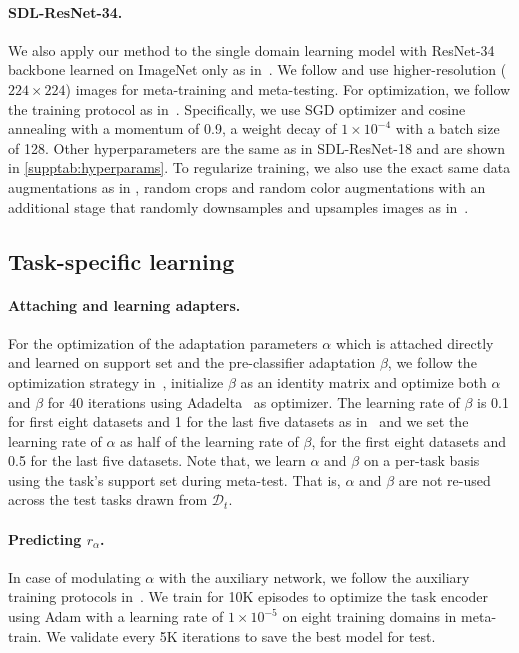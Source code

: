 \paragraph{SDL-ResNet-34.}
We also apply our method to the single domain learning model with ResNet-34 backbone learned on ImageNet only as in~\cite{doersch2020crosstransformers}. We follow \cite{doersch2020crosstransformers} and use higher-resolution ($224\times 224$) images for meta-training and meta-testing. For optimization, we follow the training protocol as in~\cite{dvornik2020selecting,li2021universal}. Specifically, we use SGD optimizer and cosine annealing with a momentum of 0.9, a weight decay of $1\times 10^{-4}$ with a batch size of 128. Other hyperparameters are the same as in SDL-ResNet-18 and are shown in \cref{supptab:hyperparams}.
To regularize training, we also use the exact same data augmentations as in \cite{dvornik2020selecting,li2021universal}, \eg random crops and random color augmentations with an additional stage that randomly downsamples and upsamples images as in~\cite{doersch2020crosstransformers}. 


\subsection{Task-specific learning}

\paragraph{Attaching and learning adapters.}
For the optimization of the adaptation parameters $\alpha$ which is attached directly and learned on support set and the pre-classifier adaptation $\beta$, we follow the optimization strategy in~\cite{li2021universal}, initialize $\beta$ as an identity matrix and optimize both $\alpha$ and $\beta$ for 40 iterations using Adadelta~\cite{zeiler2012adadelta} as optimizer. The learning rate of $\beta$ is 0.1 for first eight datasets and 1 for the last five datasets as in~\cite{li2021universal} and we set the learning rate of $\alpha$ as half of the learning rate of $\beta$,  for the first eight datasets and 0.5 for the last five datasets. Note that, we learn $\alpha$ and $\beta$ on a per-task basis using the task's support set during meta-test. That is, $\alpha$ and $\beta$ are not re-used across the test tasks drawn from $\mathcal{D}_t$.

\paragraph{Predicting $r_{\alpha}$.}
In case of modulating $\alpha$ with the auxiliary network, we follow the auxiliary training protocols in~\cite{bateni2020improved}. We train for 10K episodes to optimize the task encoder using Adam with a learning rate of $1\times 10^{-5}$ on eight training domains in meta-train. We validate every 5K iterations to save the best model for test. 



